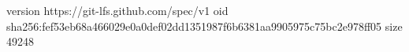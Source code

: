 version https://git-lfs.github.com/spec/v1
oid sha256:fef53eb68a466029e0a0def02dd1351987f6b6381aa9905975c75bc2e978ff05
size 49248
